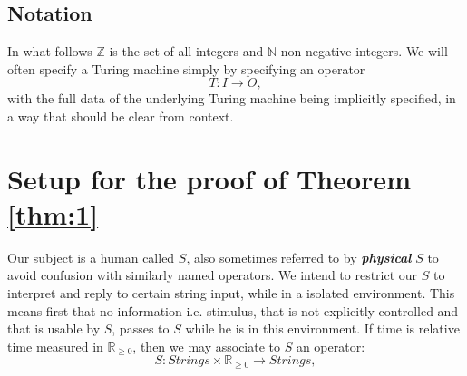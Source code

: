 \documentclass[9pt,twocolumn,twoside,lineno]{pnas-new}
\numberwithin{equation}{section}
\theoremstyle{definition}
\theoremstyle{remark}
\begin{document}
\subsection {Notation}
In what follows $\mathbb{Z}$ is the set of all integers and $\mathbb{N}$ non-negative integers. We will often specify a Turing machine simply by specifying an operator $$T: {I} \to {O},$$ with the full data of the underlying Turing machine being implicitly specified, in a way that should be clear from context.
\section {Setup for the proof of Theorem \ref{thm:1}}
Our subject is a human called $S$, also sometimes referred to by \textbf{\emph{physical}} $S$ to avoid confusion with similarly named operators.
%
%
We intend to restrict our $S$ to interpret and reply to certain string input, while in a isolated environment. This means first that no information i.e. stimulus,
that is not explicitly controlled and that is usable by $S$, passes to $S$ while he is in this environment. 
If time is relative time measured in $\mathbb{R} _{\geq 0} $,  then
we may associate to $S$ an operator: 
\begin{equation*}
   S: Strings \times \mathbb{R} _{\geq 0}  \to Strings,
\end{equation*}
\end{document}
